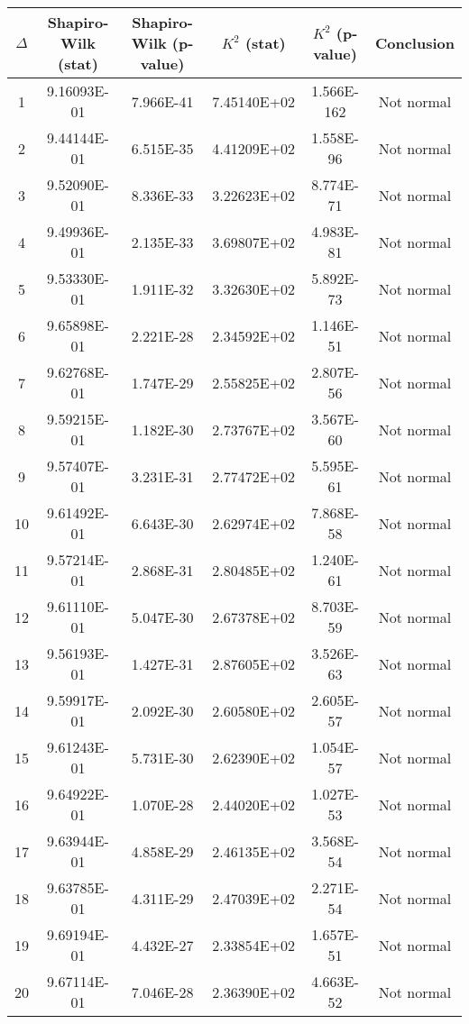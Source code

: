 \begin{table}[h]
	\begin{tabular}{|c|c|c|c|c|c|}
		\hline
		$\Delta$ &  Shapiro-Wilk (stat) & Shapiro-Wilk (p-value) & $K^2$ (stat) & $K^2$ (p-value) & Conclusion\\\hline
		\hline
		1 & 9.16093E-01 & 7.966E-41 & 7.45140E+02 & 1.566E-162 & Not normal\\\hline
		2 & 9.44144E-01 & 6.515E-35 & 4.41209E+02 & 1.558E-96 & Not normal\\\hline
		3 & 9.52090E-01 & 8.336E-33 & 3.22623E+02 & 8.774E-71 & Not normal\\\hline
		4 & 9.49936E-01 & 2.135E-33 & 3.69807E+02 & 4.983E-81 & Not normal\\\hline
		5 & 9.53330E-01 & 1.911E-32 & 3.32630E+02 & 5.892E-73 & Not normal\\\hline
		6 & 9.65898E-01 & 2.221E-28 & 2.34592E+02 & 1.146E-51 & Not normal\\\hline
		7 & 9.62768E-01 & 1.747E-29 & 2.55825E+02 & 2.807E-56 & Not normal\\\hline
		8 & 9.59215E-01 & 1.182E-30 & 2.73767E+02 & 3.567E-60 & Not normal\\\hline
		9 & 9.57407E-01 & 3.231E-31 & 2.77472E+02 & 5.595E-61 & Not normal\\\hline
		10 & 9.61492E-01 & 6.643E-30 & 2.62974E+02 & 7.868E-58 & Not normal\\\hline
		11 & 9.57214E-01 & 2.868E-31 & 2.80485E+02 & 1.240E-61 & Not normal\\\hline
		12 & 9.61110E-01 & 5.047E-30 & 2.67378E+02 & 8.703E-59 & Not normal\\\hline
		13 & 9.56193E-01 & 1.427E-31 & 2.87605E+02 & 3.526E-63 & Not normal\\\hline
		14 & 9.59917E-01 & 2.092E-30 & 2.60580E+02 & 2.605E-57 & Not normal\\\hline
		15 & 9.61243E-01 & 5.731E-30 & 2.62390E+02 & 1.054E-57 & Not normal\\\hline
		16 & 9.64922E-01 & 1.070E-28 & 2.44020E+02 & 1.027E-53 & Not normal\\\hline
		17 & 9.63944E-01 & 4.858E-29 & 2.46135E+02 & 3.568E-54 & Not normal\\\hline
		18 & 9.63785E-01 & 4.311E-29 & 2.47039E+02 & 2.271E-54 & Not normal\\\hline
		19 & 9.69194E-01 & 4.432E-27 & 2.33854E+02 & 1.657E-51 & Not normal\\\hline
		20 & 9.67114E-01 & 7.046E-28 & 2.36390E+02 & 4.663E-52 & Not normal\\\hline

\end{tabular}
\end{table}
